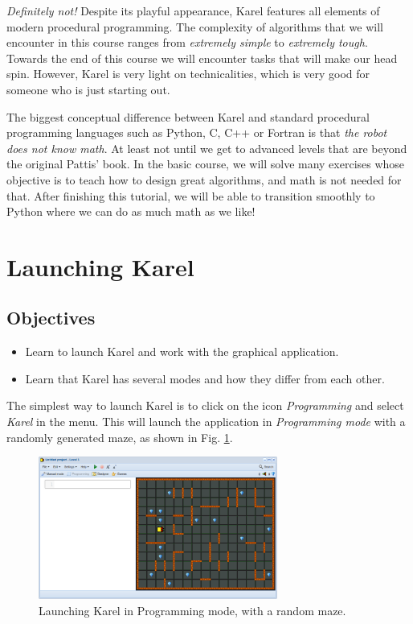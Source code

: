 {\em Definitely not!} Despite its playful appearance, Karel features all elements 
of modern procedural programming. The complexity of algorithms 
that we will encounter in this course ranges from {\em extremely simple} 
to {\em extremely tough}. Towards the end of this course we will encounter 
tasks that will make our head spin. However, Karel is very light on 
technicalities, which is very good for someone who is just starting out.

The biggest conceptual difference between Karel and standard procedural
programming languages such as Python, C, C++ or Fortran is that {\em the robot does not 
know math}. At least not until we get to advanced levels that are beyond 
the original Pattis' book. In the basic course, we will solve many exercises 
whose objective is to teach how to design great algorithms, and math is 
not needed for that. After finishing this tutorial, we will be able to transition 
smoothly to Python where we can do as much math as we like!
 
\section{Launching Karel}

\subsection{Objectives} 
\begin{itemize}
\item Learn to launch Karel and work with the graphical application.
\item Learn that Karel has several modes and how they differ from each other.
\end{itemize}
\noindent
The simplest way to launch Karel is to click on the icon 
{\em Programming} and select {\em Karel} in the menu. This will launch the application 
in {\em Programming mode} with a randomly generated maze, as shown in Fig. \ref{fig:init}.
\newpage
\begin{figure}[!ht]
\begin{center}
\includegraphics[width=0.7\textwidth]{imgk/init.png}
\end{center}
\vspace{-2mm}
\caption{Launching Karel in Programming mode, with a random maze.}
\label{fig:init}
\end{figure}

